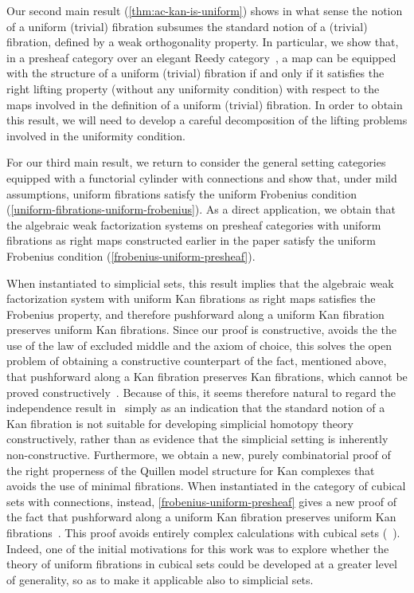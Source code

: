 \documentclass[reqno,10pt,a4paper,oneside,draft]{amsart}
\begin{document}
Our second main result (\cref{thm:ac-kan-is-uniform}) shows in what sense the notion of a uniform (trivial) fibration subsumes the standard notion of a (trivial) fibration, defined by 
a weak orthogonality property. In particular, we show that, in a presheaf category over an elegant Reedy category~\cite{bergner-rezk-elegant}, a map can be equipped with the structure of a uniform (trivial) fibration if and only if it satisfies the right lifting property (without any uniformity condition) with respect to the maps involved in the definition of a uniform (trivial) fibration.
In order to obtain this result, we will need to develop a careful decomposition of the lifting problems involved in the uniformity condition.

For our third main result, we return to consider the general setting categories equipped with a functorial cylinder with connections and show that, under mild assumptions, uniform fibrations satisfy the uniform Frobenius condition (\cref{uniform-fibrations-uniform-frobenius}). As a direct application, we obtain that the algebraic weak factorization systems on presheaf categories with uniform fibrations as right maps constructed earlier in the paper satisfy the uniform Frobenius condition (\cref{frobenius-uniform-presheaf}).

When instantiated to simplicial sets, this result implies that 
the algebraic weak factorization system 
with uniform Kan fibrations as right maps satisfies the 
Frobenius property, and therefore pushforward along a uniform Kan fibration
preserves uniform Kan fibrations. 
Since our proof is constructive, \ie avoids the the use of the law of excluded middle and the axiom of choice, 
this solves the open problem of obtaining a constructive counterpart of the fact, mentioned above, that pushforward along a  Kan fibration preserves  Kan fibrations, which cannot be proved constructively~\cite{coquand-non-constructivity-kan}. Because of this, it seems therefore natural to regard the independence result in~\cite{coquand-non-constructivity-kan} simply as an indication that the standard notion of a Kan fibration is not suitable for developing simplicial homotopy theory constructively, rather than as evidence that the simplicial setting is inherently non-constructive. Furthermore, we obtain a new, purely combinatorial proof of the right properness of the Quillen model structure for Kan complexes that avoids the use of minimal fibrations.
When instantiated in the category of cubical sets with connections, instead, \cref{frobenius-uniform-presheaf} gives  a new  
proof of the fact that pushforward along a uniform Kan fibration preserves uniform Kan fibrations~\cite{cohen-et-al:cubicaltt}. This proof avoids entirely complex calculations with cubical sets (\cf~\cite{huber-thesis}). Indeed, one of the initial motivations for this work was to explore whether the theory of uniform fibrations
in cubical sets could be developed at a greater level of generality, so as to make it applicable also to simplicial sets. 
\end{document}

